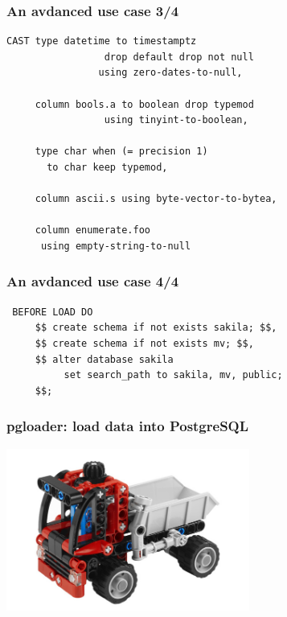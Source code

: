 \documentclass{beamer}
\begin{document}
\begin{frame}[fragile]
  \frametitle{An avdanced use case 3/4}

\begin{verbatim}
CAST type datetime to timestamptz
                 drop default drop not null
                using zero-dates-to-null,

     column bools.a to boolean drop typemod
                 using tinyint-to-boolean,

     type char when (= precision 1)
       to char keep typemod,

     column ascii.s using byte-vector-to-bytea,

     column enumerate.foo
      using empty-string-to-null
\end{verbatim}
\end{frame}

\begin{frame}[fragile]
  \frametitle{An avdanced use case 4/4}

\begin{verbatim}
 BEFORE LOAD DO
     $$ create schema if not exists sakila; $$,
     $$ create schema if not exists mv; $$,
     $$ alter database sakila
          set search_path to sakila, mv, public;
     $$;
\end{verbatim}
\end{frame}

\begin{frame}
  \frametitle{pgloader: load data into PostgreSQL}


  \begin{center}
    \includegraphics[height=2.1in]{pgloader.jpg}
  \end{center}
\end{frame}
\end{document}
